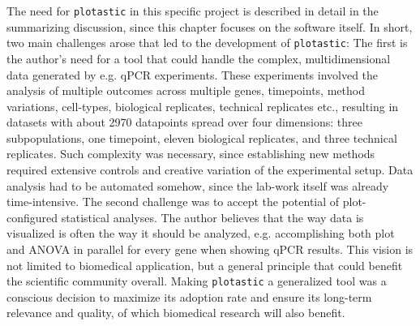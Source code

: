 The need for \texttt{plotastic} in this specific project is described in detail
in the summarizing discussion, since this chapter focuses on the software
itself. In short, two main challenges arose that led to the development of
\texttt{plotastic}: The first is the author's need for a tool that could handle
the complex, multidimensional data generated by e.g. qPCR experiments. These
experiments involved the analysis of multiple outcomes across multiple genes,
timepoints, method variations, cell-types, biological replicates, technical
replicates etc., resulting in datasets with about 2970 datapoints spread over
four dimensions: three subpopulations, one timepoint, eleven biological
replicates, and three technical replicates. Such complexity was necessary, since
establishing new methods required extensive controls and creative variation of
the experimental setup. Data analysis had to be automated somehow, since the
lab-work itself was already time-intensive. The second challenge was to accept
the potential of plot-configured statistical analyses. The author believes that
the way data is visualized is often the way it should be analyzed, e.g.
accomplishing both plot and ANOVA in parallel for every gene when showing qPCR
results. This vision is not limited to biomedical application, but a general
principle that could benefit the scientific community overall. Making
\texttt{plotastic} a generalized tool was a conscious decision to maximize its
adoption rate and ensure its long-term relevance and quality, of which
biomedical research will also benefit.













